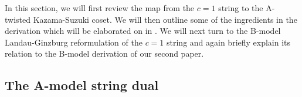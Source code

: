 \documentclass[english]{article}
\let\mc=\mathcal
\begin{document}
In this section, we will first review the map from the $c=1$ string to the A-twisted Kazama-Suzuki coset. %
We will then outline some of the ingredients in the derivation which will be elaborated on in \cite{DSDIII}. We will next turn to the B-model Landau-Ginzburg reformulation of the $c=1$ string and again briefly explain its relation to the B-model derivation of our second paper.

  



\subsection{The A-model string dual}

\end{document}
